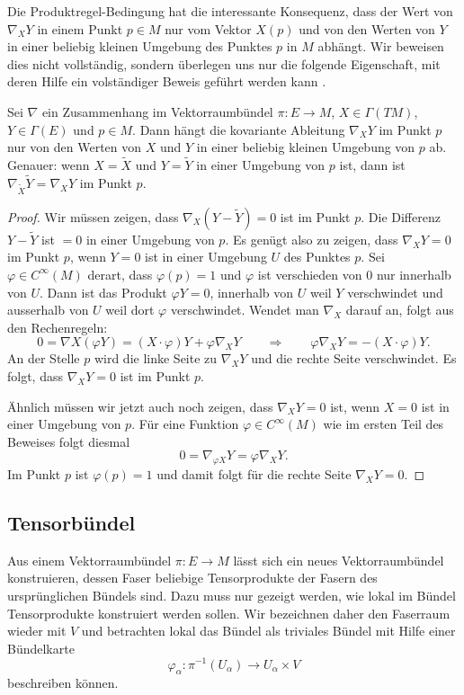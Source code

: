 Die Produktregel-Bedingung hat die interessante Konsequenz, dass der
Wert von $\nabla_XY$ in einem Punkt $p\in M$ nur vom Vektor $X(p)$ und
von den Werten von $Y$ in einer beliebig kleinen Umgebung des Punktes
$p$ in $M$ abhängt.
Wir beweisen dies nicht vollständig, sondern überlegen uns nur die
folgende Eigenschaft, mit deren Hilfe ein volständiger Beweis geführt
werden kann \cite[Proposition 4.5]{buch:leerm}.

\begin{lemma}
Sei $\nabla$ ein Zusammenhang im Vektorraumbündel $\pi\colon E\to M$,
$X\in \Gamma(TM)$, $Y\in \Gamma(E)$ und $p\in M$.
Dann hängt die kovariante Ableitung $\nabla_XY$ im Punkt $p$ nur von
den Werten von $X$ und $Y$ in einer beliebig kleinen Umgebung von $p$
ab.
Genauer: wenn $X=\tilde{X}$ und $Y=\tilde{Y}$ in einer Umgebung von
$p$ ist, dann ist $\nabla_{\tilde{X}}\tilde{Y} = \nabla_XY$ im Punkt $p$.
\end{lemma}

\begin{proof}
Wir müssen zeigen, dass $\nabla_X(Y-\tilde{Y})=0$ ist im Punkt $p$.
Die Differenz $Y-\tilde{Y}$ ist $=0$ in einer Umgebung von $p$.
Es genügt also zu zeigen, dass $\nabla_XY=0$ im Punkt $p$, wenn $Y=0$
ist in einer Umgebung $U$ des Punktes $p$.
Sei $\varphi\in C^\infty(M)$ derart, dass $\varphi(p)=1$ und 
$\varphi$ ist verschieden von $0$ nur innerhalb von $U$.
Dann ist das Produkt $\varphi Y=0$, innerhalb von $U$ weil $Y$ verschwindet
und ausserhalb von $U$ weil dort $\varphi$ verschwindet.
Wendet man $\nabla_X$ darauf an, folgt aus den Rechenregeln:
\[
0
=
\nabla X(\varphi Y)
=
(X\cdot \varphi)Y
+
\varphi\nabla_X Y
\qquad\Rightarrow\qquad
\varphi\nabla_X Y
=
-(X\cdot\varphi)Y.
\]
An der Stelle $p$ wird die linke Seite zu $\nabla_XY$ und die rechte
Seite verschwindet.
Es folgt, dass $\nabla_XY=0$ ist im Punkt $p$.

Ähnlich müssen wir jetzt auch noch zeigen, dass $\nabla_XY=0$ ist,
wenn $X=0$ ist in einer Umgebung von $p$.
Für eine Funktion $\varphi\in C^\infty(M)$ wie im ersten Teil des Beweises
folgt diesmal
\[
0
=
\nabla_{\varphi X}Y
=
\varphi\nabla_XY.
\]
Im Punkt $p$ ist $\varphi(p)=1$ und damit folgt für die rechte Seite
$\nabla_XY=0$.
\end{proof}

%
%
\subsection{Tensorbündel}
Aus einem Vektorraumbündel $\pi\colon E\to M$ lässt sich ein neues
Vektorraumbündel konstruieren, dessen Faser beliebige Tensorprodukte
der Fasern des ursprünglichen Bündels sind.
Dazu muss nur gezeigt werden, wie lokal im Bündel Tensorprodukte
konstruiert werden sollen.
Wir bezeichnen daher den Faserraum wieder mit $V$ und betrachten
lokal das Bündel als triviales Bündel mit Hilfe einer Bündelkarte
\[
\varphi_\alpha
\colon
\pi^{-1}(U_\alpha)
\to
U_\alpha\times V 
\]
beschreiben können.

